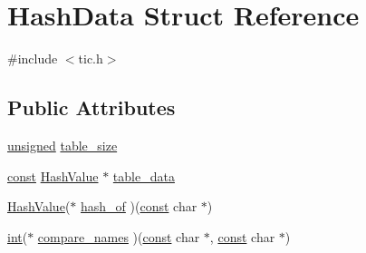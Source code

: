 \hypertarget{struct_hash_data}{\section{Hash\-Data Struct Reference}
\label{struct_hash_data}
}


{\ttfamily \#include $<$tic.\-h$>$}

\subsection*{Public Attributes}
\begin{DoxyCompactItemize}
\item 
\hyperlink{curses_8priv_8h_aca40206900cfc164654362fa8d4ad1e6}{unsigned} \hyperlink{struct_hash_data_a19ecb4447ad3d32cb95d5654cd02eb95}{table\-\_\-size}
\item 
\hyperlink{term__entry_8h_a57bd63ce7f9a353488880e3de6692d5a}{const} \hyperlink{tic_8h_a0abca0b033672183ce7cbf1d4e18f4ce}{Hash\-Value} $\ast$ \hyperlink{struct_hash_data_a254c48901309fab4a2ef74a51e433081}{table\-\_\-data}
\item 
\hyperlink{tic_8h_a0abca0b033672183ce7cbf1d4e18f4ce}{Hash\-Value}($\ast$ \hyperlink{struct_hash_data_aa5fc2114a16c367da9c4e0471cef1103}{hash\-\_\-of} )(\hyperlink{term__entry_8h_a57bd63ce7f9a353488880e3de6692d5a}{const} char $\ast$)
\item 
\hyperlink{term__entry_8h_ad65b480f8c8270356b45a9890f6499ae}{int}($\ast$ \hyperlink{struct_hash_data_a8651098b6100a9bb85073a326e629606}{compare\-\_\-names} )(\hyperlink{term__entry_8h_a57bd63ce7f9a353488880e3de6692d5a}{const} char $\ast$, \hyperlink{term__entry_8h_a57bd63ce7f9a353488880e3de6692d5a}{const} char $\ast$)
\end{DoxyCompactItemize}


